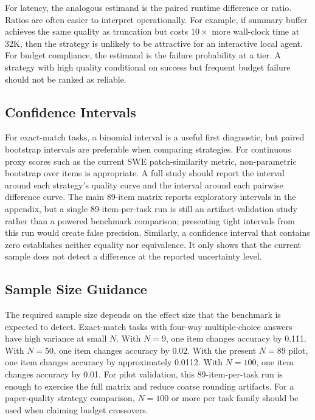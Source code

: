 \documentclass[11pt]{article}
\begin{document}
For latency, the analogous estimand is the paired runtime difference or ratio.
Ratios are often easier to interpret operationally.  For example, if summary
buffer achieves the same quality as truncation but costs $10\times$ more
wall-clock time at 32K, then the strategy is unlikely to be attractive for an
interactive local agent.  For budget compliance, the estimand is the failure
probability at a tier.  A strategy with high quality conditional on success
but frequent budget failure should not be ranked as reliable.

\subsection{Confidence Intervals}

For exact-match tasks, a binomial interval is a useful first diagnostic, but
paired bootstrap intervals are preferable when comparing strategies.  For
continuous proxy scores such as the current SWE patch-similarity metric,
non-parametric bootstrap over items is appropriate.  A full study should report
the interval around each strategy's quality curve and the interval around each
pairwise difference curve.  The main 89-item matrix reports exploratory
intervals in the appendix, but a single 89-item-per-task run is still an
artifact-validation study rather than a powered benchmark comparison;
presenting tight intervals from this run would create false precision.
Similarly, a confidence interval that contains zero establishes neither
equality nor equivalence.  It only shows that the current sample does not
detect a difference at the reported uncertainty level.

\subsection{Sample Size Guidance}

The required sample size depends on the effect size that the benchmark is
expected to detect.  Exact-match tasks with four-way multiple-choice answers
have high variance at small $N$.  With $N=9$, one item changes accuracy by
0.111.  With $N=50$, one item changes accuracy by 0.02.  With the present
$N=89$ pilot, one item changes accuracy by approximately 0.0112.  With
$N=100$, one item changes accuracy by 0.01.  For pilot validation, this
89-item-per-task run is enough to exercise the full matrix and reduce coarse rounding
artifacts.  For a paper-quality strategy comparison, $N=100$ or more per task
family should be used when claiming budget crossovers.
\end{document}
